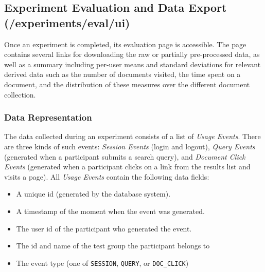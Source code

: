 \documentclass[a4paper]{usiinfbachelorproject}
\begin{document}
\begin{appendices}
        \newpage


        \subsection{Experiment Evaluation and Data Export \small{(/experiments/eval/ui)}}

        Once an experiment is completed, its evaluation page is accessible. The page contains several links for downloading the raw or
        partially pre-processed data, as well as a summary including per-user means and standard deviations for relevant derived data such as
        the number of documents visited, the time spent on a document, and the distribution of these measures over the different
        document collection.

        \subsubsection{Data Representation}

        The data collected during an experiment consists of a list of \emph{Usage Events}. There are three kinds of such events:
        \emph{Session Events} (login and logout), \emph{Query Events} (generated when a participant submits a search query),
        and \emph{Document Click Events} (generated when a participant clicks on a link from the results list and visits a page).
        All \emph{Usage Events} contain the following data fields:

        \begin{itemize}

        \item A unique id (generated by the database system).

        \item A timestamp of the moment when the event was generated.

        \item The user id of the participant who generated the event.

        \item The id and name of the test group the participant belongs to

        \item The event type (one of \texttt{SESSION}, \texttt{QUERY}, or \texttt{DOC\_CLICK})

        \end{itemize}


\end{appendices}
\end{document}
